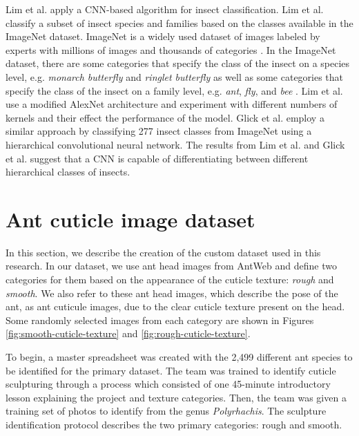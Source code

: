 \documentclass{aci}
\numberwithin{equation}{section}
\begin{document}
Lim et al. \cite{lim_performance_2017} apply a CNN-based algorithm for insect
classification. Lim et al. \cite{lim_performance_2017} classify a subset of
insect species and families based on the classes available in the ImageNet
dataset. ImageNet is a widely used dataset of images labeled by experts with
millions of images and thousands of categories \cite{deng_imagenet_2009}. In the
ImageNet dataset, there are some categories that specify the class of the insect
on a species level, e.g. \textit{monarch butterfly} and \textit{ringlet
    butterfly} as well as some categories that specify the class of the insect on a
family level, e.g. \textit{ant}, \textit{fly}, and \textit{bee}
\cite{deng_imagenet_2009}. Lim et al. \cite{lim_performance_2017} use a modified
AlexNet architecture and experiment with different numbers of kernels and their
effect the performance of the model. Glick et al. \cite{glick_insect_2016}
employ a similar approach by classifying 277 insect classes from ImageNet using
a hierarchical convolutional neural network. The results from Lim et al.
\cite{lim_performance_2017} and Glick et al. \cite{glick_insect_2016} suggest
that a CNN is capable of differentiating between different hierarchical classes
of insects.

\section{Ant cuticle image dataset}


In this section, we describe the creation of the custom dataset used in this
research. In our dataset, we use ant head images from AntWeb
\cite{perrichot_antweb_2012} and define two categories for them based on the
appearance of the cuticle texture: \textit{rough} and \textit{smooth}. We also
refer to these ant head images, which describe the pose of the ant, as ant
cuticule images, due to the clear cuticle texture present on the head. Some
randomly selected images from each category are shown in Figures
\ref{fig:smooth-cuticle-texture} and \ref{fig:rough-cuticle-texture}.

To begin, a master spreadsheet was created with the 2,499 different ant species
to be identified for the primary dataset. The team was trained to identify
cuticle sculpturing through a process which consisted of one 45-minute
introductory lesson explaining the project and texture categories. Then, the
team was given a training set of photos to identify from the genus
\textit{Polyrhachis}. The sculpture identification protocol describes the two
primary categories: rough and smooth.
\end{document}
